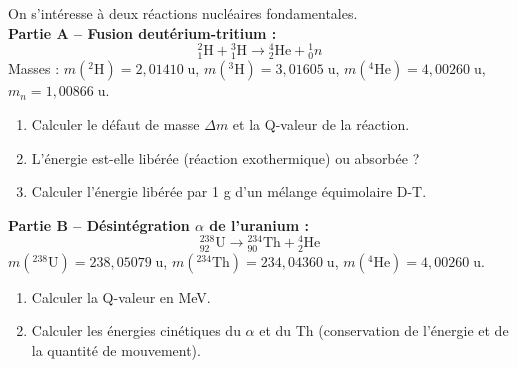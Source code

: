 \documentclass[12pt,a4paper]{article}
\begin{document}
\begin{boiteexercice}
On s'intéresse à deux réactions nucléaires fondamentales.\\
\textbf{Partie A -- Fusion deutérium-tritium :}
\[
{}^2_1\text{H} + {}^3_1\text{H} \rightarrow {}^4_2\text{He} + {}^1_0n
\]
Masses : $m({}^2\text{H})=2{,}01410\;\text{u}$, $m({}^3\text{H})=3{,}01605\;\text{u}$, $m({}^4\text{He})=4{,}00260\;\text{u}$, $m_n=1{,}00866\;\text{u}$.
\begin{enumerate}
  \item Calculer le défaut de masse $\Delta m$ et la Q-valeur de la réaction.
  \item L'énergie est-elle libérée (réaction exothermique) ou absorbée ?
  \item Calculer l'énergie libérée par 1 g d'un mélange équimolaire D-T.
\end{enumerate}
\textbf{Partie B -- Désintégration $\alpha$ de l'uranium :}
\[
{}^{238}_{92}\text{U} \rightarrow {}^{234}_{90}\text{Th} + {}^4_2\text{He}
\]
$m({}^{238}\text{U})=238{,}05079\;\text{u}$, $m({}^{234}\text{Th})=234{,}04360\;\text{u}$, $m({}^4\text{He})=4{,}00260\;\text{u}$.
\begin{enumerate}[resume]
  \item Calculer la Q-valeur en MeV.
  \item Calculer les énergies cinétiques du $\alpha$ et du Th (conservation de l'énergie et de la quantité de mouvement).
\end{enumerate}
\end{boiteexercice}
\end{document}

